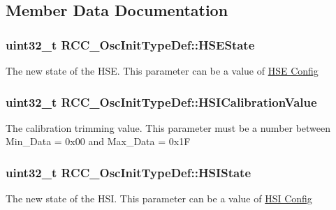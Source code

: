 \subsection{Member Data Documentation}
\subsubsection[{\texorpdfstring{H\+S\+E\+State}{HSEState}}]{\setlength{\rightskip}{0pt plus 5cm}uint32\+\_\+t R\+C\+C\+\_\+\+Osc\+Init\+Type\+Def\+::\+H\+S\+E\+State}\hypertarget{struct_r_c_c___osc_init_type_def_a7e05d6eec98ed8cdaba00ca3d167ff72}{}\label{struct_r_c_c___osc_init_type_def_a7e05d6eec98ed8cdaba00ca3d167ff72}
The new state of the H\+SE. This parameter can be a value of \hyperlink{group___r_c_c___h_s_e___config}{H\+SE Config} 
\subsubsection[{\texorpdfstring{H\+S\+I\+Calibration\+Value}{HSICalibrationValue}}]{\setlength{\rightskip}{0pt plus 5cm}uint32\+\_\+t R\+C\+C\+\_\+\+Osc\+Init\+Type\+Def\+::\+H\+S\+I\+Calibration\+Value}\hypertarget{struct_r_c_c___osc_init_type_def_a9b2e48e452d0c334f2b9473216064560}{}\label{struct_r_c_c___osc_init_type_def_a9b2e48e452d0c334f2b9473216064560}
The calibration trimming value. This parameter must be a number between Min\+\_\+\+Data = 0x00 and Max\+\_\+\+Data = 0x1F 
\subsubsection[{\texorpdfstring{H\+S\+I\+State}{HSIState}}]{\setlength{\rightskip}{0pt plus 5cm}uint32\+\_\+t R\+C\+C\+\_\+\+Osc\+Init\+Type\+Def\+::\+H\+S\+I\+State}\hypertarget{struct_r_c_c___osc_init_type_def_a39b62cae65fe7a251000354e5bba8cb6}{}\label{struct_r_c_c___osc_init_type_def_a39b62cae65fe7a251000354e5bba8cb6}
The new state of the H\+SI. This parameter can be a value of \hyperlink{group___r_c_c___h_s_i___config}{H\+SI Config} 
